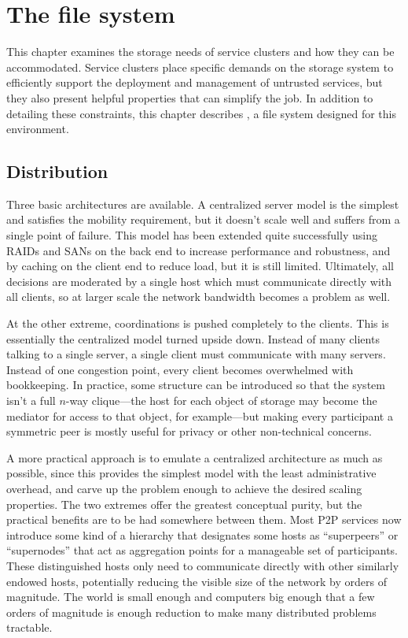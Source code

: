 \chapter{The \envoy file system}

This chapter examines the storage needs of service clusters and how they can be accommodated. Service clusters place specific demands on the storage system to efficiently support the deployment and management of untrusted services, but they also present helpful properties that can simplify the job. In addition to detailing these constraints, this chapter describes \envoy, a file system designed for this environment.

\section{Distribution}

Three basic architectures are available. A centralized server model is the simplest and satisfies the mobility requirement, but it doesn't scale well and suffers from a single point of failure. This model has been extended quite successfully using RAIDs and SANs on the back end to increase performance and robustness, and by caching on the client end to reduce load, but it is still limited. Ultimately, all decisions are moderated by a single host which must communicate directly with all clients, so at larger scale the network bandwidth becomes a problem as well.

At the other extreme, coordinations is pushed completely to the clients. This is essentially the centralized model turned upside down. Instead of many clients talking to a single server, a single client must communicate with many servers. Instead of one congestion point, every client becomes overwhelmed with bookkeeping. In practice, some structure can be introduced so that the system isn't a full $n$-way clique---the host for each object of storage may become the mediator for access to that object, for example---but making every participant a symmetric peer is mostly useful for privacy or other non-technical concerns.

A more practical approach is to emulate a centralized architecture as much as possible, since this provides the simplest model with the least administrative overhead, and carve up the problem enough to achieve the desired scaling properties. The two extremes offer the greatest conceptual purity, but the practical benefits are to be had somewhere between them. Most P2P services now introduce some kind of a hierarchy that designates some hosts as ``superpeers'' or ``supernodes'' that act as aggregation points for a manageable set of participants. These distinguished hosts only need to communicate directly with other similarly endowed hosts, potentially reducing the visible size of the network by orders of magnitude. The world is small enough and computers big enough that a few orders of magnitude is enough reduction to make many distributed problems tractable.

